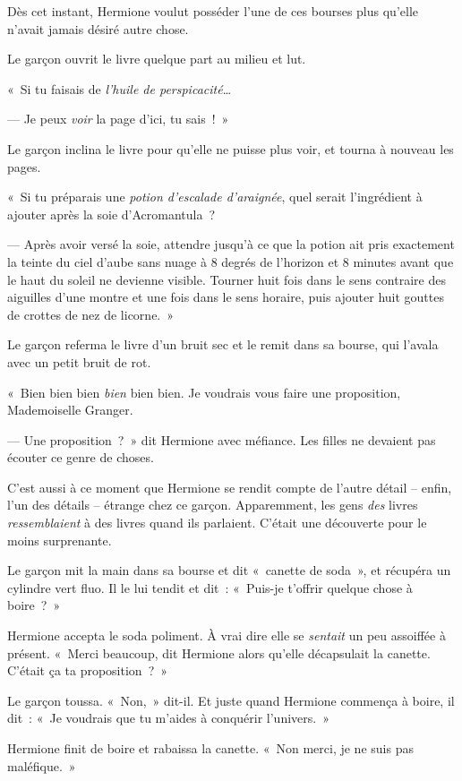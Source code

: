 Dès cet instant, Hermione voulut posséder l'une de ces bourses plus qu'elle n'avait jamais désiré autre chose.

Le garçon ouvrit le livre quelque part au milieu et lut.

«~Si tu faisais de \emph{l'huile de perspicacité}…

--- Je peux \emph{voir} la page d'ici, tu sais~!~»

Le garçon inclina le livre pour qu'elle ne puisse plus voir, et tourna à nouveau les pages.

«~Si tu préparais une \emph{potion d'escalade d'araignée}, quel serait l'ingrédient à ajouter après la soie d'Acromantula~?

--- Après avoir versé la soie, attendre jusqu'à ce que la potion ait pris exactement la teinte du ciel d'aube sans nuage à 8 degrés de l'horizon et 8 minutes avant que le haut du soleil ne devienne visible. Tourner huit fois dans le sens contraire des aiguilles d'une montre et une fois dans le sens horaire, puis ajouter huit gouttes de crottes de nez de licorne.~»

Le garçon referma le livre d'un bruit sec et le remit dans sa bourse, qui l'avala avec un petit bruit de rot.

«~Bien bien bien \emph{bien} bien bien. Je voudrais vous faire une proposition, Mademoiselle Granger.

--- Une proposition~?~» dit Hermione avec méfiance. Les filles ne devaient pas écouter ce genre de choses.

C'est aussi à ce moment que Hermione se rendit compte de l'autre détail -- enfin, l'un des détails -- étrange chez ce garçon. Apparemment, les gens \emph{des} livres \emph{ressemblaient} à des livres quand ils parlaient. C'était une découverte pour le moins surprenante.

Le garçon mit la main dans sa bourse et dit «~canette de soda~», et récupéra un cylindre vert fluo. Il le lui tendit et dit~: «~Puis-je t'offrir quelque chose à boire~?~»

Hermione accepta le soda poliment. À vrai dire elle se \emph{sentait} un peu assoiffée à présent. «~Merci beaucoup, dit Hermione alors qu'elle décapsulait la canette. C'était ça ta proposition~?~»

Le garçon toussa. «~Non,~» dit-il. Et juste quand Hermione commença à boire, il dit~: «~Je voudrais que tu m'aides à conquérir l'univers.~»

Hermione finit de boire et rabaissa la canette. «~Non merci, je ne suis pas maléfique.~»

